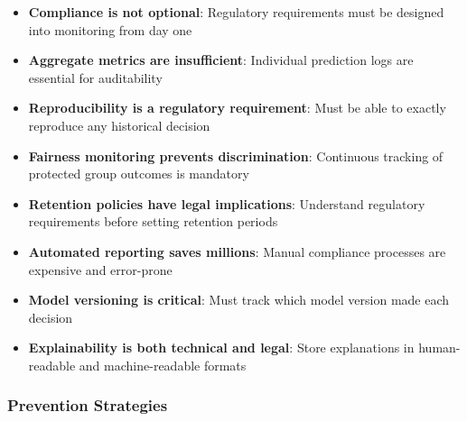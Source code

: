 \begin{itemize}
    \item \textbf{Compliance is not optional}: Regulatory requirements must be designed into monitoring from day one
    \item \textbf{Aggregate metrics are insufficient}: Individual prediction logs are essential for auditability
    \item \textbf{Reproducibility is a regulatory requirement}: Must be able to exactly reproduce any historical decision
    \item \textbf{Fairness monitoring prevents discrimination}: Continuous tracking of protected group outcomes is mandatory
    \item \textbf{Retention policies have legal implications}: Understand regulatory requirements before setting retention periods
    \item \textbf{Automated reporting saves millions}: Manual compliance processes are expensive and error-prone
    \item \textbf{Model versioning is critical}: Must track which model version made each decision
    \item \textbf{Explainability is both technical and legal}: Store explanations in human-readable and machine-readable formats
\end{itemize}

\subsubsection{Prevention Strategies}

